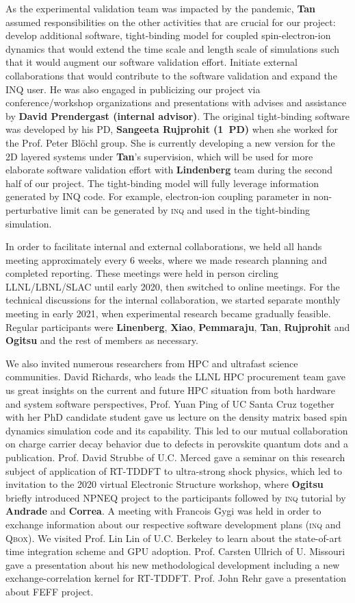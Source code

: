 As the experimental validation team was impacted by the pandemic, {\bf Tan} assumed responsibilities on the other activities that are crucial for our project: develop additional software, tight-binding model for coupled spin-electron-ion dynamics that would extend the time scale and length scale of simulations such that it would augment our software validation effort.
Initiate external collaborations that would contribute to the software validation and expand the INQ user. 
He was also engaged in publicizing our project via conference/workshop organizations and presentations with advises and assistance by {\bf David Prendergast (internal advisor)}. 
The original tight-binding software was developed by his PD, {\bf Sangeeta Rujprohit (1~PD)} when she worked for the Prof. Peter Bl\"{o}chl group. 
She is currently developing a new version for the 2D layered systems under {\bf Tan}'s supervision, which will be used for more elaborate software validation effort with {\bf Lindenberg} team during the second half of our project.
The tight-binding model will fully leverage information generated by INQ code. 
For example, electron-ion coupling parameter in non-perturbative limit can be generated by \textsc{inq} and used in the tight-binding simulation. 

In order to facilitate internal and external collaborations, we held all hands meeting approximately every 6 weeks, where we made research planning and completed reporting.
These meetings were held in person circling LLNL/LBNL/SLAC until early 2020, then switched to online meetings.
For the technical discussions for the internal collaboration, we started separate monthly meeting in early 2021, when experimental research became gradually feasible. 
Regular participants were {\bf Linenberg}, {\bf Xiao}, {\bf Pemmaraju}, {\bf Tan}, {\bf Rujprohit} and {\bf Ogitsu} and the rest of members as necessary.

We also invited numerous researchers from HPC and ultrafast science communities. 
David Richards, who leads the LLNL HPC procurement team gave us great insights on the current and future HPC situation from both hardware and system software perspectives, 
Prof. Yuan Ping of UC Santa Cruz together with her PhD candidate student gave us lecture on the density matrix based spin dynamics simulation code and its capability. This led to our mutual collaboration on charge carrier decay behavior due to defects in perovskite quantum dots and a publication. 
Prof. David Strubbe of U.C. Merced gave a seminar on this research subject of application of RT-TDDFT to ultra-strong shock physics, which led to invitation to the 2020 virtual Electronic Structure workshop, where {\bf Ogitsu} briefly introduced NPNEQ project to the participants followed by \textsc{inq} tutorial by {\bf Andrade} and {\bf Correa}. 
A meeting with Francois Gygi was held in order to exchange information about our respective software development plans (\textsc{inq} and \textsc{Qbox}). 
We visited Prof. Lin Lin of U.C. Berkeley to learn about the state-of-art time integration scheme and GPU adoption. 
Prof. Carsten Ullrich of U. Missouri gave a presentation about his new methodological development including a new exchange-correlation kernel for RT-TDDFT. 
Prof. John Rehr gave a presentation about FEFF project.

